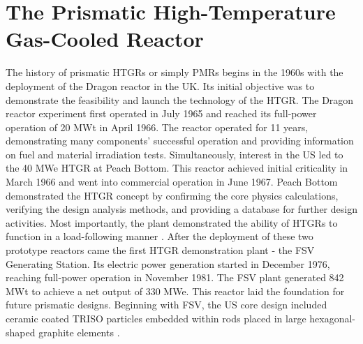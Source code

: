 \section{The Prismatic High-Temperature Gas-Cooled Reactor}

The history of prismatic \glspl{HTGR} or simply \glspl{PMR} begins in the 1960s with the deployment of the Dragon reactor in the \gls{UK}.
Its initial objective was to demonstrate the feasibility and launch the technology of the \gls{HTGR}.
The Dragon reactor experiment first operated in July 1965 and reached its full-power operation of 20 MWt in April 1966.
The reactor operated for 11 years, demonstrating many components' successful operation and providing information on fuel and material irradiation tests.
Simultaneously, interest in the \gls{US} led to the 40 MWe \gls{HTGR} at Peach Bottom.
This reactor achieved initial criticality in March 1966 and went into commercial operation in June 1967.
Peach Bottom demonstrated the \gls{HTGR} concept by confirming the core physics calculations, verifying the design analysis methods, and providing a database for further design activities.
Most importantly, the plant demonstrated the ability of \glspl{HTGR} to function in a load-following manner \cite{brey_development_2001}.
After the deployment of these two prototype reactors came the first \gls{HTGR} demonstration plant - the \gls{FSV} Generating Station.
Its electric power generation started in December 1976, reaching full-power operation in November 1981.
The \gls{FSV} plant generated 842 MWt to achieve a net output of 330 MWe.
This reactor laid the foundation for future prismatic designs.
Beginning with \gls{FSV}, the \gls{US} core design included ceramic coated \gls{TRISO} particles embedded within rods placed in large hexagonal-shaped graphite elements \cite{brey_development_2001}.

